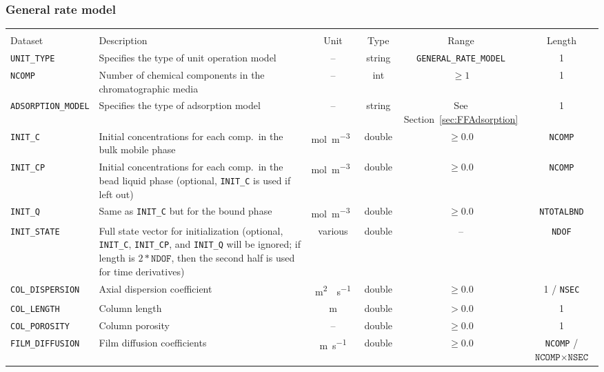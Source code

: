 \FloatBarrier
\subsubsection{General rate model}

\begin{table}[!ht]
\footnotesize
\begin{tabu}to \linewidth[m]{lX[m]cccc} \toprule
{} \\
\rowfont[c]\normalfont Dataset & Description & Unit & Type & Range & Length \everyrow{\midrule}\\
\texttt{UNIT\_TYPE} & Specifies the type of unit operation model & -- & string & \texttt{GENERAL\_RATE\_MODEL} & 1 \\
\texttt{NCOMP}& Number of chemical components in the chromatographic media & -- & int  & $\geq 1$ & 1 \\
\texttt{ADSORPTION\_MODEL} & Specifies the type of adsorption model & -- & string & See Section~\ref{sec:FFAdsorption} & 1 \\
\texttt{INIT\_C} & Initial concentrations for each comp.\ in the bulk mobile phase & \si{\mol\per\cubic\metre{}} & double & $\geq 0.0$ & \texttt{NCOMP}\\
\texttt{INIT\_CP} & Initial concentrations for each comp.\ in the bead liquid phase (optional, \texttt{INIT\_C} is used if left out) & \si{\mol\per\cubic\metre{}} & double & $\geq 0.0$ & \texttt{NCOMP}\\
\texttt{INIT\_Q} & Same as \texttt{INIT\_C} but for the bound phase & \si{\mol\per\cubic\metre{}} & double & $\geq 0.0$ & \texttt{NTOTALBND}\\
\texttt{INIT\_STATE} & Full state vector for initialization (optional, \texttt{INIT\_C}, \texttt{INIT\_CP}, and \texttt{INIT\_Q} will be ignored; if length is $2 * \texttt{NDOF}$, then the second half is used for time derivatives) & various & double & -- & \texttt{NDOF} \\
\texttt{COL\_DISPERSION} & Axial dispersion coefficient & \si{\square\metre{}\per\second} & double & $\geq 0.0$ & 1 / \texttt{NSEC}\\
\texttt{COL\_LENGTH} & Column length & \si{\metre} & double & $> 0.0$ & 1\\
\texttt{COL\_POROSITY} & Column porosity & -- & double & $\geq 0.0$ & 1\\
\texttt{FILM\_DIFFUSION} & Film diffusion coefficients & \si{\metre\per\second} & double & $\geq 0.0$ & \texttt{NCOMP} / {$\texttt{NCOMP} \times \texttt{NSEC}$}\\

\end{tabu}
\end{table}
